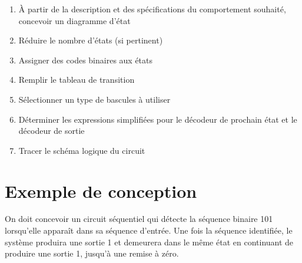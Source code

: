 \documentclass[letter, oneside]{book}
\begin{document}
\begin{enumerate}
\item À partir de la description et des spécifications du comportement
souhaité, concevoir un diagramme d'état
\item Réduire le nombre d'états (si pertinent)
\item Assigner des codes binaires aux états
\item Remplir le tableau de transition
\item Sélectionner un type de bascules à utiliser
\item Déterminer les expressions simplifiées pour le décodeur de prochain
état et le décodeur de sortie
\item Tracer le schéma logique du circuit
\end{enumerate}

\section{Exemple de conception}
\label{sec:org31d0ef0}

On doit concevoir un circuit séquentiel qui détecte la séquence
binaire 101 lorsqu'elle apparaît dans sa séquence d'entrée. Une fois
la séquence identifiée, le système produira une sortie 1 et demeurera
dans le même état en continuant de produire une sortie 1, jusqu'à une
remise à zéro.
\end{document}
